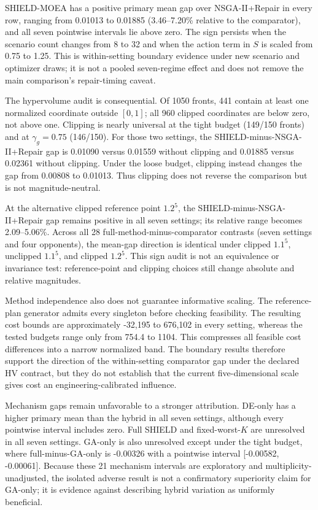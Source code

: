 \documentclass[energies,article,submit,moreauthors]{Definitions/mdpi}
\begin{document}
SHIELD-MOEA has a positive primary mean gap over NSGA-II+Repair in every row, ranging from 0.01013 to 0.01885 (3.46--7.20\% relative to the comparator), and all seven pointwise intervals lie above zero. The sign persists when the scenario count changes from 8 to 32 and when the action term in \(S\) is scaled from 0.75 to 1.25. This is within-setting boundary evidence under new scenario and optimizer draws; it is not a pooled seven-regime effect and does not remove the main comparison's repair-timing caveat.

The hypervolume audit is consequential. Of 1050 fronts, 441 contain at least one normalized coordinate outside \([0,1]\); all 960 clipped coordinates are below zero, not above one. Clipping is nearly universal at the tight budget (149/150 fronts) and at \(\gamma_g=0.75\) (146/150). For those two settings, the SHIELD-minus-NSGA-II+Repair gap is 0.01090 versus 0.01559 without clipping and 0.01885 versus 0.02361 without clipping. Under the loose budget, clipping instead changes the gap from 0.00808 to 0.01013. Thus clipping does not reverse the comparison but is not magnitude-neutral.

At the alternative clipped reference point \(1.2^5\), the SHIELD-minus-NSGA-II+Repair gap remains positive in all seven settings; its relative range becomes 2.09--5.06\%. Across all 28 full-method-minus-comparator contrasts (seven settings and four opponents), the mean-gap direction is identical under clipped \(1.1^5\), unclipped \(1.1^5\), and clipped \(1.2^5\). This sign audit is not an equivalence or invariance test: reference-point and clipping choices still change absolute and relative magnitudes.

Method independence also does not guarantee informative scaling. The reference-plan generator admits every singleton before checking feasibility. The resulting cost bounds are approximately -32,195 to 676,102 in every setting, whereas the tested budgets range only from 754.4 to 1104. This compresses all feasible cost differences into a narrow normalized band. The boundary results therefore support the direction of the within-setting comparator gap under the declared HV contract, but they do not establish that the current five-dimensional scale gives cost an engineering-calibrated influence.

Mechanism gaps remain unfavorable to a stronger attribution. DE-only has a higher primary mean than the hybrid in all seven settings, although every pointwise interval includes zero. Full SHIELD and fixed-worst-\(K\) are unresolved in all seven settings. GA-only is also unresolved except under the tight budget, where full-minus-GA-only is -0.00326 with a pointwise interval {[}-0.00582, -0.00061{]}. Because these 21 mechanism intervals are exploratory and multiplicity-unadjusted, the isolated adverse result is not a confirmatory superiority claim for GA-only; it is evidence against describing hybrid variation as uniformly beneficial.
\end{document}
